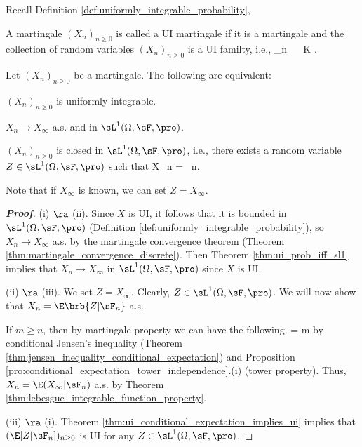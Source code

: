 Recall Definition \ref{def:uniformly_integrable_probability},

\begin{definition}\label{def:uniformly_integrable_martingale}
A martingale $(X_n)_{n\geq 0}$ is called a UI martingale if it is a martingale and the collection of random variables $(X_n)_{n\geq 0}$ is a UI familty, i.e.,
\be
\sup_{n} \E{}  \  \ K \to \infty.
\ee
\end{definition}

\begin{theorem}\label{thm:martingale_ui_as_l1_closed_discrete}
Let $(X_n)_{ n \geq 0}$ be a martingale. The following are equivalent:
\ben
\item [(i)] $(X_n)_{n\geq 0}$ is uniformly integrable.
\item [(ii)] $X_n \to  X_\infty$ a.s. and in $\sL^1(\Omega,\sF,\pro)$.
\item [(iii)] $(X_n)_{n\geq 0}$ is closed in $\sL^1(\Omega,\sF,\pro)$, i.e., there exists a random variable $Z\in \sL^1(\Omega ,\sF,\pro)$ such that
\be
X_n = \E{}\ n.
\ee

Note that if $X_\infty$ is known, we can set $Z = X_\infty$.
\een
\end{theorem}

\begin{proof}[\bf Proof]
(i) $\ra$ (ii). Since $X$ is UI, it follows that it is bounded in $\sL^1(\Omega,\sF,\pro)$ (Definition \ref{def:uniformly_integrable_probability}), so $X_n \to  X_\infty$ a.s. by the martingale convergence theorem (Theorem \ref{thm:martingale_convergence_discrete}). Then Theorem \ref{thm:ui_prob_iff_sl1} implies that $X_n \to  X_\infty$ in $\sL^1(\Omega,\sF,\pro)$ since $X$ is UI.

(ii) $\ra$ (iii). We set $Z = X_\infty$. Clearly, $Z\in \sL^1(\Omega ,\sF,\pro)$. We will now show that $X_n = \E\brb{Z|\sF_n}$ a.s..

If $m \geq n$, then by martingale property we can have the following.
\be
\E{} = \E{} \leq \E{}  m\to \infty
\ee
by conditional Jensen's inequality (Theorem \ref{thm:jensen_inequality_conditional_expectation}) and Proposition \ref{pro:conditional_expectation_tower_independence}.(i) (tower property). Thus, $X_n = \E(X_\infty|\sF_n)$ a.s. by Theorem \ref{thm:lebesgue_integrable_function_property}.



(iii) $\ra$ (i). Theorem \ref{thm:ui_conditional_expectation_implies_ui} implies that $(\E[Z|\sF_n])_{ n \geq 0}$ is UI for any $Z \in \sL^1(\Omega,\sF,\pro)$.%
\end{proof}

